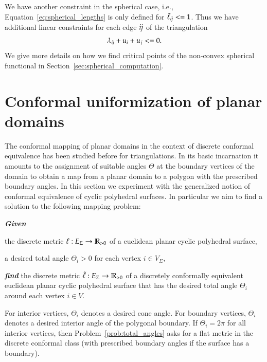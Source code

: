 \documentclass[Thesis]{subfiles}
\begin{document}
We have another constraint in the spherical case, i.e., Equation~\ref{eq:spherical_lengths} is only defined for $\tilde\ell_{\it ij} <= 1$.
Thus we have additional linear constraints for each edge $\it ij$ of the triangulation
\[\lambda_{\it ij} + u_i + u_j <= 0.\]
We give more details on how we find critical points of the non-convex spherical functional in Section~\ref{sec:spherical_computation}.


\section{Conformal uniformization of planar domains}

The conformal mapping of planar domains in the context of discrete conformal equivalence has been studied before for triangulations. 
In its basic incarnation it amounts to the assignment of suitable angles $\Theta$ at the boundary vertices of the domain to obtain a map from a planar domain to a polygon with the prescribed boundary angles. 
In this section we experiment with the generalized notion of conformal equivalence of cyclic polyhedral surfaces.
In particular we aim to find a solution to the following mapping problem:

\begin{problem}
\label{prob:total_angles}
\textbf{\itshape{Given}}

\begin{compactitem}
\item the discrete metric $\ell:E_{\Sigma}\rightarrow\mathbb R_{>0}$ of a
euclidean planar cyclic polyhedral surface,
\item a desired total angle $\Theta_{i}>0$ for each vertex
$i\in V_{\Sigma}$,
\end{compactitem}

\smallskip\noindent%
\textbf{\itshape{find}} the discrete metric
$\tilde\ell:E_{\Sigma}\rightarrow\mathbb R_{>0}$ of a discretely
conformally equivalent euclidean planar cyclic polyhedral surface that has
the desired total angle $\Theta_{i}$ around each vertex $i\in
V$.
\end{problem}

For interior vertices, $\Theta_i$ denotes a desired cone angle. For
boundary vertices, $\Theta_i$ denotes a desired interior angle of the
polygonal boundary. If $\Theta_{i}=2\pi$ for all interior vertices,
then Problem~\ref{prob:total_angles} asks for a flat metric in the
discrete conformal class (with prescribed boundary angles if the
surface has a boundary).
\end{document}
